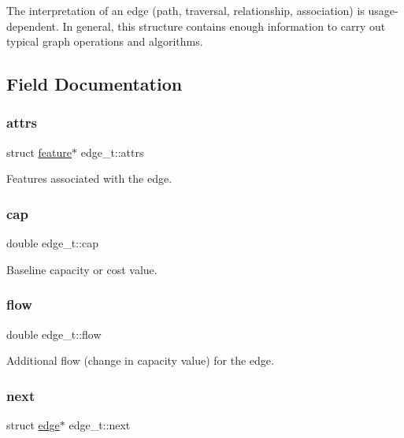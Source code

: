 The interpretation of an edge (path, traversal, relationship, association) is usage-\/dependent. In general, this structure contains enough information to carry out typical graph operations and algorithms. 

\subsection{Field Documentation}
\mbox{\label{structedge__t_ab2d506a2def85cee084a5e4691bae746}} 
\subsubsection{\texorpdfstring{attrs}{attrs}}
{\footnotesize\ttfamily struct \hyperlink{graphdata_8h_a068417678f021a74e911edd39f8d0bce}{feature}$\ast$ edge\+\_\+t\+::attrs}

Features associated with the edge. \mbox{\label{structedge__t_a008f610ba47f30e49b6350e4bb00d6aa}} 
\subsubsection{\texorpdfstring{cap}{cap}}
{\footnotesize\ttfamily double edge\+\_\+t\+::cap}

Baseline capacity or cost value. \mbox{\label{structedge__t_a45d88baf5d0fa8abd4b512e6856b9b2d}} 
\subsubsection{\texorpdfstring{flow}{flow}}
{\footnotesize\ttfamily double edge\+\_\+t\+::flow}

Additional flow (change in capacity value) for the edge. \mbox{\label{structedge__t_ae9f9c230f5fc9409f88af96ef17a23fa}} 
\subsubsection{\texorpdfstring{next}{next}}
{\footnotesize\ttfamily struct \hyperlink{graphdata_8h_a641a8a4cd064e02a13e6c15d1b2df541}{edge}$\ast$ edge\+\_\+t\+::next}



